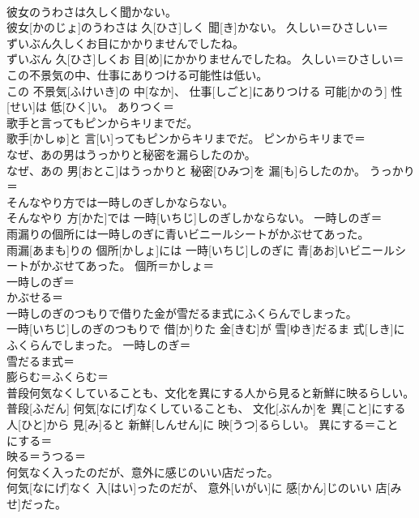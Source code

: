 \documentclass[8pt]{extreport}
\begin{document}
\begin{CJK}{UTF8}{min}
\\	彼女のうわさは久しく聞かない。	
\\	彼女[かのじょ]のうわさは 久[ひさ]しく 聞[き]かない。	久しい＝ひさしい＝ 
\\	ずいぶん久しくお目にかかりませんでしたね。	
\\	ずいぶん 久[ひさ]しくお 目[め]にかかりませんでしたね。	久しい＝ひさしい＝ 
\\	この不景気の中、仕事にありつける可能性は低い。	
\\	この 不景気[ふけいき]の 中[なか]、 仕事[しごと]にありつける 可能[かのう] 性[せい]は 低[ひく]い。	ありつく＝ 
\\	歌手と言ってもピンからキリまでだ。	
\\	歌手[かしゅ]と 言[い]ってもピンからキリまでだ。	ピンからキリまで＝ 
\\	なぜ、あの男はうっかりと秘密を漏らしたのか。	
\\	なぜ、あの 男[おとこ]はうっかりと 秘密[ひみつ]を 漏[も]らしたのか。	うっかり＝ 
\\	そんなやり方では一時しのぎしかならない。	
\\	そんなやり 方[かた]では 一時[いちじ]しのぎしかならない。	一時しのぎ＝ 
\\	雨漏りの個所には一時しのぎに青いビニールシートがかぶせてあった。	
\\	雨漏[あまも]りの 個所[かしょ]には 一時[いちじ]しのぎに 青[あお]いビニールシートがかぶせてあった。	個所＝かしょ＝ 
\\	一時しのぎ＝ 
\\	かぶせる＝ 
\\	一時しのぎのつもりで借りた金が雪だるま式にふくらんでしまった。	
\\	一時[いちじ]しのぎのつもりで 借[か]りた 金[きむ]が 雪[ゆき]だるま 式[しき]にふくらんでしまった。	一時しのぎ＝ 
\\	雪だるま式＝ 
\\	膨らむ＝ふくらむ＝ 
\\	普段何気なくしていることも、文化を異にする人から見ると新鮮に映るらしい。	
\\	普段[ふだん] 何気[なにげ]なくしていることも、 文化[ぶんか]を 異[こと]にする 人[ひと]から 見[み]ると 新鮮[しんせん]に 映[うつ]るらしい。	異にする＝こと　にする＝ 
\\	映る＝うつる＝ 
\\	何気なく入ったのだが、意外に感じのいい店だった。	
\\	何気[なにげ]なく 入[はい]ったのだが、 意外[いがい]に 感[かん]じのいい 店[みせ]だった。	

\end{CJK}
\end{document}
